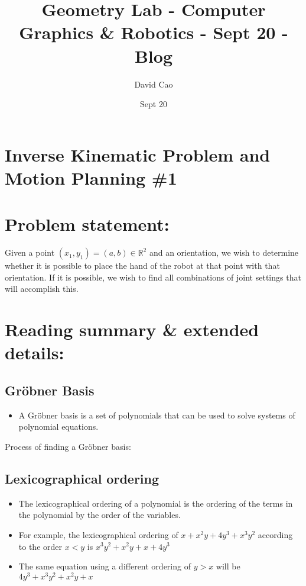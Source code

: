 \documentclass[11pt]{article}
\title{Geometry Lab - Computer Graphics \& Robotics - Sept 20 - Blog}
\author{David Cao}
\date{Sept 20}
\begin{document}
\maketitle

\section*{Inverse Kinematic Problem and Motion Planning \#1}
\section{Problem statement:}
Given a point $(x_1, y_1) = (a, b) \in \mathbb{R}^2$ and an orientation, we wish to determine whether it is possible to place the hand of the robot at that point with that orientation. If it is possible, we wish to find all combinations of joint settings that will accomplish this.

\section{Reading summary \& extended details:}
\subsection{Gröbner Basis}
\begin{itemize}
    \item A Gröbner basis is a set of polynomials that can be used to solve systems of polynomial equations.
\end{itemize}
Process of finding a Gröbner basis:
\subsection*{Lexicographical ordering}
\begin{itemize}
    \item The lexicographical ordering of a polynomial is the ordering of the terms in the polynomial by the order of the variables.
    \item For example, the lexicographical ordering of $x + x^2y + 4y^3 + x^3y^2$ according to the order $x < y$ is $x^3y^2 + x^2y + x + 4y^3$
    \item The same equation using a different ordering of $y > x$ will be $4y^3+x^3y^2 + x^2y + x$
\end{itemize}
\end{document}
